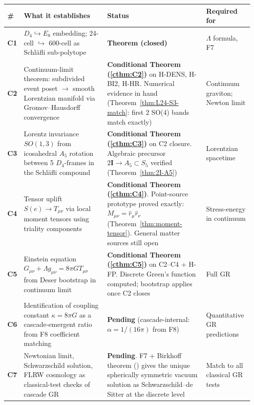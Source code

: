\documentclass[11pt]{article}
\theoremstyle{plain}
\theoremstyle{definition}
\theoremstyle{remark}
\newcommand{\twoI}{2\mathbf{I}}
\begin{document}
\begin{center}
\renewcommand{\arraystretch}{1.35}
\begin{tabular}{p{0.5cm} p{4.5cm} l p{4.5cm}}
\toprule
\textbf{\#} & \textbf{What it establishes} & \textbf{Status} & \textbf{Required for} \\
\midrule
\textbf{C1} & $D_4 \hookrightarrow E_8$ embedding; 24-cell $\hookrightarrow$ 600-cell as Schl\"afli sub-polytope & \textbf{Theorem (closed)} & $\Lambda$ formula, F7 \\

\textbf{C2} & Continuum-limit theorem: subdivided event poset $\to$ smooth Lorentzian manifold via Gromov--Hausdorff convergence & \textbf{Conditional Theorem (\ref{cthm:C2})} on H-DENS, H-BI2, H-HR. Numerical evidence in hand (Theorem~\ref{thm:L24-S3-match}: first 2 SO(4) bands match exactly) & Continuum graviton; Newton limit \\

\textbf{C3} & Lorentz invariance $SO(1,3)$ from icosahedral $A_5$ rotation between 5 $D_4$-frames in the Schl\"afli compound & \textbf{Conditional Theorem (\ref{cthm:C3})} on C2 closure. Algebraic precursor $\twoI \to A_5 \subset S_5$ verified (Theorem~\ref{thm:2I-A5}) & Lorentzian spacetime \\

\textbf{C4} & Tensor uplift $S(e) \to T_{\mu\nu}$ via local moment tensors using triality components & \textbf{Conditional Theorem (\ref{cthm:C4})}. Point-source prototype proved exactly: $M_{\mu\nu} = \hat r_\mu \hat r_\nu$ (Theorem~\ref{thm:moment-tensor}). General matter sources still open & Stress-energy in continuum \\

\textbf{C5} & Einstein equation $G_{\mu\nu} + \Lambda g_{\mu\nu} = 8\pi G T_{\mu\nu}$ from Deser bootstrap in continuum limit & \textbf{Conditional Theorem (\ref{cthm:C5})} on C2--C4 + H-FP. Discrete Green's function computed; bootstrap applies once C2 closes & Full GR \\

\textbf{C6} & Identification of coupling constant $\kappa = 8\pi G$ as a cascade-emergent ratio from F8 coefficient matching & \textbf{Pending} (cascade-internal: $\alpha = 1/(16\pi)$ from F8) & Quantitative GR predictions \\

\textbf{C7} & Newtonian limit, Schwarzschild solution, FLRW cosmology as classical-test checks of cascade GR & \textbf{Pending}. F7 + Birkhoff theorem (\citealp{Birkhoff1923, Jebsen1921}) gives the unique spherically symmetric vacuum solution as Schwarzschild--de Sitter at the discrete level & Match to all classical GR tests \\
\bottomrule
\end{tabular}
\end{center}
\end{document}
